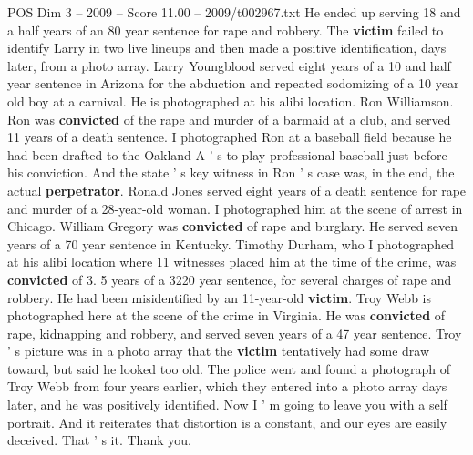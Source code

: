 \begin{textsample}{POS Dim 3 – 2009 – Score 11.00 – 2009/t002967.txt}
He ended up serving 18 and a half years of an 80 year sentence for rape and robbery.
The \textbf{victim} failed to identify Larry in two live lineups and then made a positive identification, days later, from a photo array.
Larry Youngblood served eight years of a 10 and half year sentence in Arizona for the abduction and repeated sodomizing of a 10 year old boy at a carnival.
He is photographed at his alibi location.
Ron Williamson.
Ron was \textbf{convicted} of the rape and murder of a barmaid at a club, and served 11 years of a death sentence.
I photographed Ron at a baseball field because he had been drafted to the Oakland A ' s to play professional baseball just before his conviction.
And the state ' s key witness in Ron ' s case was, in the end, the actual \textbf{perpetrator}.
Ronald Jones served eight years of a death sentence for rape and murder of a 28-year-old woman.
I photographed him at the scene of arrest in Chicago.
William Gregory was \textbf{convicted} of rape and burglary.
He served seven years of a 70 year sentence in Kentucky.
Timothy Durham, who I photographed at his alibi location where 11 witnesses placed him at the time of the crime, was \textbf{convicted} of 3. 5 years of a 3220 year sentence, for several charges of rape and robbery.
He had been misidentified by an 11-year-old \textbf{victim}.
Troy Webb is photographed here at the scene of the crime in Virginia.
He was \textbf{convicted} of rape, kidnapping and robbery, and served seven years of a 47 year sentence.
Troy ' s picture was in a photo array that the \textbf{victim} tentatively had some draw toward, but said he looked too old.
The police went and found a photograph of Troy Webb from four years earlier, which they entered into a photo array days later, and he was positively identified.
Now I ' m going to leave you with a self portrait.
And it reiterates that distortion is a constant, and our eyes are easily deceived.
That ' s it.
Thank you.

\end{textsample}
